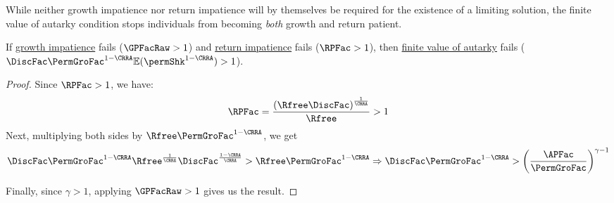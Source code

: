 \documentclass[BufferStockTheory]{subfiles}
\begin{document}
\begin{comment}
below stuff goes in growth section.
Strong growth impatience guarantees that the \textit{expectation} of normalized market resources becomes less than one market resources limit to infinity, since the condition will imply $\min \{\mathbb{E}\frac{\APFac}{\Rnd{\PermGroFac}}, \mathbb{E}\frac{R}{\Rnd{\PermGroFac}}\}< \GPFacNrm<1$. 


The growth impatience condition relates the \textit{expected} growth factor of permanent income to the \hyperlink{APFAC}{absolute patience factor}. Following the discussion below Assumption \ref{ass:RIC}, the growth factor of the ratio of expected market resources to expected permanent income as $m$ limits to infinity becomes $\min \{\frac{\APFac}{\PermGroFac}, \frac{R}{\PermGroFac}\}$, and we have $\min \{\frac{\APFac}{\PermGroFac}, \frac{R}{\PermGroFac}\}< \GPFacRaw$. Thus, growth impatience ensures the ratio of \textit{expected} market resources to \textit{expected} permanent income eventually falls as $\mNrm$ grows.
\end{comment}

While neither growth impatience nor return impatience will by themselves be required for the existence of a limiting solution, the finite value of autarky condition stops individuals from becoming \textit{both} growth and return patient. 

\begin{claim}\label{claim:noRICGIC}
If \hyperlink{GIC-Raw}{growth impatience} fails ($\GPFacRaw  > 1$) and \hyperlink{RIC}{return impatience} fails ($\RPFac  > 1$), then \hyperlink{FVAC}{finite value of autarky} fails ($\DiscFac \PermGroFac^{1-\CRRA}\mathbb{E}(\permShk^{1-\CRRA})>1$). 
\end{claim}

\begin{proof}
Since $\RPFac  > 1$, we have:
%
%
\begin{equation}
\RPFac = \frac{\left(\Rfree\DiscFac\right)^{\frac{1}{\CRRA}}}{\Rfree}>1
\end{equation}
%
Next, multiplying both sides by $\Rfree\PermGroFac^{1-\CRRA}$, we get
%
\begin{equation}
\DiscFac\PermGroFac^{1-\CRRA}\Rfree^{\frac{1}{\CRRA}}\DiscFac^{\frac{1-\CRRA}{\CRRA}}{}>\Rfree \PermGroFac^{1-\CRRA} \Rightarrow \DiscFac\PermGroFac^{1-\CRRA}>\left(\frac{\APFac}{\PermGroFac}\right)^{\gamma-1}
\end{equation}
%

Finally, since $\gamma>1$, applying $\GPFacRaw  > 1$ gives us the result. 

\end{proof}
\end{document}
